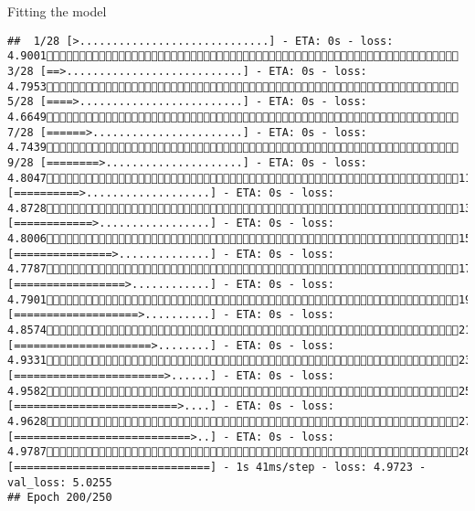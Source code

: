 \documentclass[
  ignorenonframetext,
]{beamer}
\begin{document}
\begin{frame}[fragile]{Fitting the model}
\begin{verbatim}
##  1/28 [>.............................] - ETA: 0s - loss: 4.9001 3/28 [==>...........................] - ETA: 0s - loss: 4.7953 5/28 [====>.........................] - ETA: 0s - loss: 4.6649 7/28 [======>.......................] - ETA: 0s - loss: 4.7439 9/28 [========>.....................] - ETA: 0s - loss: 4.804711/28 [==========>...................] - ETA: 0s - loss: 4.872813/28 [============>.................] - ETA: 0s - loss: 4.800615/28 [===============>..............] - ETA: 0s - loss: 4.778717/28 [=================>............] - ETA: 0s - loss: 4.790119/28 [===================>..........] - ETA: 0s - loss: 4.857421/28 [=====================>........] - ETA: 0s - loss: 4.933123/28 [=======================>......] - ETA: 0s - loss: 4.958225/28 [=========================>....] - ETA: 0s - loss: 4.962827/28 [===========================>..] - ETA: 0s - loss: 4.978728/28 [==============================] - 1s 41ms/step - loss: 4.9723 - val_loss: 5.0255
## Epoch 200/250

\end{verbatim}
\end{frame}
\end{document}
